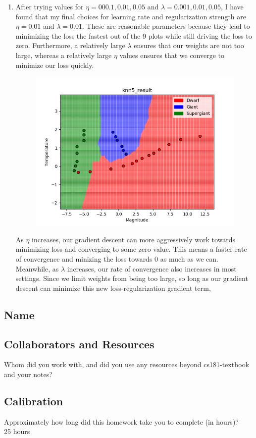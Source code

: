 \documentclass[submit]{harvardml}
\begin{document}
\begin{enumerate}
    \item After trying values for $\eta = 000.1, 0.01, 0.05$ and $\lambda = 0.001, 0.01, 0.05$, I have found that my final choices for learning rate and regularization strength are $\eta = 0.01$ and $\lambda = 0.01$. These are reasonable parameters because they lead to minimizing the loss the fastest out of the 9 plots while still driving the loss to zero. Furthermore, a relatively large $\lambda$ ensures that our weights are not too large, whereas a relatively large $\eta$ values ensures that we converge to minimize our loss quickly. \\
    \begin{figure} [h!]
        \centering
        \includegraphics[height=0.4\textheight]{HW2/knn5_result.png}
    \end{figure}

    As $\eta$ increases, our gradient descent can more aggressively work towards minimizing loss and converging to some zero value. This means a faster rate of convergence and minizing the loss towards $0$ as much as we can. \\
    Meanwhile, as $\lambda$ increases, our rate of convergence also increases in most settings. Since we limit weights from being too large, so long as our gradient descent can minimize this new loss-regularization gradient term, 
    
\end{enumerate}

\newpage
\subsection*{Name}

\subsection*{Collaborators and Resources}
Whom did you work with, and did you use any resources beyond cs181-textbook and your notes?

\subsection*{Calibration}
Approximately how long did this homework take you to complete (in hours)? \\
25 hours
\end{document}
